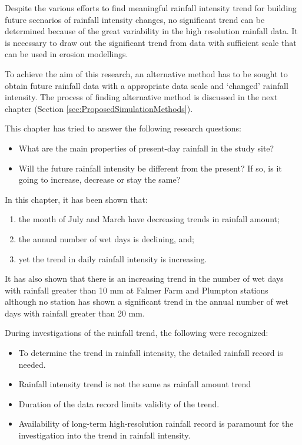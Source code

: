 Despite the various efforts to find meaningful rainfall intensity trend for
building future scenarios of rainfall intensity changes, no significant trend
can be determined because of the great variability in the high resolution
rainfall data. It is necessary to draw out the significant trend from data with
sufficient scale that can be used in erosion modellings.

To achieve the aim of this research, an alternative method has to be sought to
obtain future rainfall data with a appropriate data scale and `changed' rainfall
intensity. The process of finding alternative method is discussed in the next
chapter (Section \ref{sec:ProposedSimulationMethods}).

This chapter has tried to answer the following research questions:
\begin{itemize}
  \item What are the main properties of present-day rainfall in the study site?
  \item Will the future rainfall intensity be different from the present?
If so, is it going to increase, decrease or stay the same?
\end{itemize}

In this chapter, it has been shown that:
\begin{enumerate}
  \item the month of July and March have decreasing trends in rainfall amount;
  \item the annual number of wet days is declining, and;
  \item yet the trend in daily rainfall intensity is increasing.
\end{enumerate}

It has also shown that there is an increasing trend in the number of wet days
with rainfall greater than 10 mm at Falmer Farm and Plumpton stations although
no station has shown a significant trend in the annual number of wet days with
rainfall greater than 20 mm.

During investigations of the rainfall trend, the following were recognized:
\begin{itemize}
  \item To determine the trend in rainfall intensity, the detailed rainfall
record is needed.
  \item Rainfall intensity trend is not the same as rainfall amount trend
  \item Duration of the data record limits validity of the trend.
  \item Availability of long-term high-resolution rainfall record is
paramount for the investigation into the trend in rainfall intensity.
\end{itemize}

